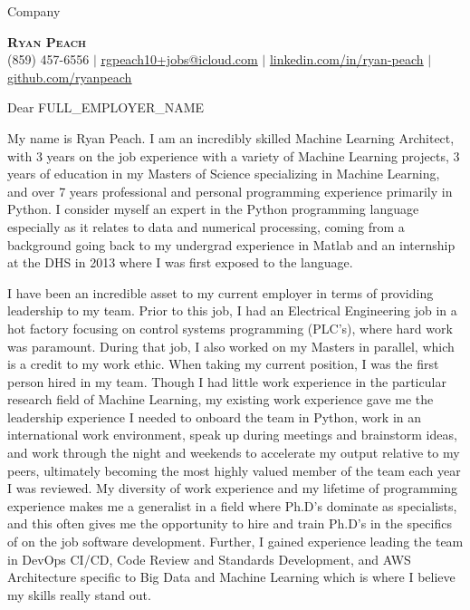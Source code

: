 \documentclass[]{letter}
\begin{document}
\begin{letter}{Company}

    \begin{center}
        \textbf{\Huge \scshape Ryan Peach} \\ \vspace{1pt}
        \small (859) 457-6556 $|$ \href{mailto:rgpeach10+jobs@icloud.com}{\underline{rgpeach10+jobs@icloud.com}} $|$
        \href{https://linkedin.com/in/...}{\underline{linkedin.com/in/ryan-peach}} $|$
        \href{https://github.com/...}{\underline{github.com/ryanpeach}}
    \end{center}

    \opening{Dear {{ FULL_EMPLOYER_NAME }}}
    
    My name is Ryan Peach. I am an incredibly skilled Machine Learning Architect, with 3 years on the job experience with a variety of Machine Learning projects, 3 years of education in my Masters of Science specializing in Machine Learning, and over 7 years professional and personal programming experience primarily in Python. I consider myself an expert in the Python programming language especially as it relates to data and numerical processing, coming from a background going back to my undergrad experience in Matlab and an internship at the DHS in 2013 where I was first exposed to the language.

    I have been an incredible asset to my current employer in terms of providing leadership to my team. Prior to this job, I had an Electrical Engineering job in a hot factory focusing on control systems programming (PLC's), where hard work was paramount. During that job, I also worked on my Masters in parallel, which is a credit to my work ethic. When taking my current position, I was the first person hired in my team. Though I had little work experience in the particular research field of Machine Learning, my existing work experience gave me the leadership experience I needed to onboard the team in Python, work in an international work environment, speak up during meetings and brainstorm ideas, and work through the night and weekends to accelerate my output relative to my peers, ultimately becoming the most highly valued member of the team each year I was reviewed. My diversity of work experience and my lifetime of programming experience makes me a generalist in a field where Ph.D's dominate as specialists, and this often gives me the opportunity to hire and train Ph.D's in the specifics of on the job software development. Further, I gained experience leading the team in DevOps CI/CD, Code Review and Standards Development, and AWS Architecture specific to Big Data and Machine Learning which is where I believe my skills really stand out.
    

\end{letter}
\end{document}
